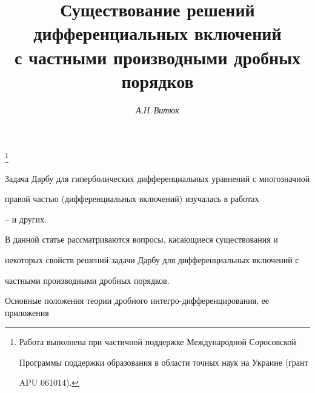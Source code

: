 

\author{\it А.Н.\,Витюк} 


\title{Существование решений дифференциальных включений\\ 


с частными производными дробных порядков} 


 


\thanks{Работа выполнена при частичной поддержке Международной Соросовской 


Программы поддержки образования в области точных наук на Украине (грант 


APU 061014).} 


\date{} 




 


\pagestyle{plain} %


 


 




 


\maketitle 


 




 


 


Задача Дарбу для гиперболических дифференциальных уравнений с многозначной 


правой частью (дифференциальных включений) изучалась в работах 


\cite{Daw}--\cite{Vit} и других. 


 


В данной статье рассматриваются вопросы, касающиеся существования и 


некоторых свойств решений задачи Дарбу для дифференциальных включений с 


частными производными дробных порядков. 


 


Основные положения теории дробного интегро-дифференцирования, ее приложения 



